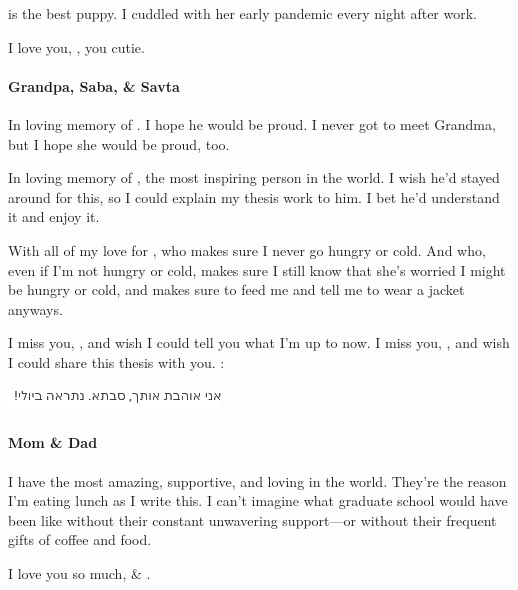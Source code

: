  is the best puppy. I cuddled with her early pandemic every night after work.

I love you, , you cutie.

\paragraph{Grandpa, Saba, \& Savta}

In loving memory of . I hope he would be proud.
I never got to meet Grandma, but I hope she would be proud, too.

In loving memory of , the most inspiring person in the world.
I wish he'd stayed around for this, so I could explain my thesis work to him.
I bet he'd understand it and enjoy it.

With all of my love for , who makes sure I never go hungry or cold.
And who, even if I'm not hungry or cold, makes sure I still know that she's worried I might be hungry or cold,
and makes sure to feed me and tell me to wear a jacket anyways.

I miss you, , and wish I could tell you what I'm up to now.
I miss you, , and wish I could share this thesis with you.
:

\begin{flushright}
\includegraphics[height=6mm]{savta.png}
\end{flushright}

\paragraph{Mom \& Dad}

I have the most amazing, supportive, and loving  in the world.
They're the reason I'm eating lunch as I write this.
I can't imagine what graduate school would have been like without their constant
unwavering support---or without their frequent gifts of coffee and food.

I love you so much,  \& .


